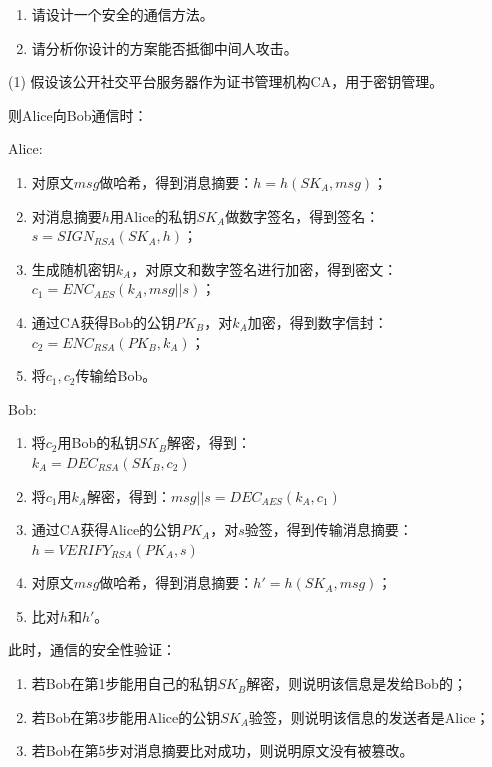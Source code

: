 \begin{enumerate}
    \item 请设计一个安全的通信方法。
    \item 请分析你设计的方案能否抵御中间人攻击。
\end{enumerate}

\begin{Solution}
    (1) 假设该公开社交平台服务器作为证书管理机构CA，用于密钥管理。

    则Alice向Bob通信时：

    Alice:

    \begin{enumerate}
        \item 对原文$msg$做哈希，得到消息摘要：$h = h(SK_A, msg)$；
        \item 对消息摘要$h$用Alice的私钥$SK_A$做数字签名，得到签名：\\
        $s = SIGN_{RSA}(SK_A, h)$；
        \item 生成随机密钥$k_A$，对原文和数字签名进行加密，得到密文：\\
        $c_1 = ENC_{AES}(k_A, msg||s)$；
        \item 通过CA获得Bob的公钥$PK_B$，对$k_A$加密，得到数字信封：\\
        $c_2 = ENC_{RSA}(PK_B, k_A)$；
        \item 将$c_1,c_2$传输给Bob。
    \end{enumerate}
    
    Bob:
    \begin{enumerate}
        \item 将$c_2$用Bob的私钥$SK_B$解密，得到：\\
        $k_A = DEC_{RSA}(SK_B, c_2)$
        \item 将$c_1$用$k_A$解密，得到：$msg||s = DEC_{AES}(k_A, c_1)$
        \item 通过CA获得Alice的公钥$PK_A$，对$s$验签，得到传输消息摘要：\\
        $h = VERIFY_{RSA}(PK_A, s)$
        \item 对原文$msg$做哈希，得到消息摘要：$h' = h(SK_A, msg)$；
        \item 比对$h$和$h'$。
    \end{enumerate}

    此时，通信的安全性验证：
    \begin{enumerate}
        \item 若Bob在第1步能用自己的私钥$SK_B$解密，则说明该信息是发给Bob的；
        \item 若Bob在第3步能用Alice的公钥$SK_A$验签，则说明该信息的发送者是Alice；
        \item 若Bob在第5步对消息摘要比对成功，则说明原文没有被篡改。
    \end{enumerate}


\end{Solution}
